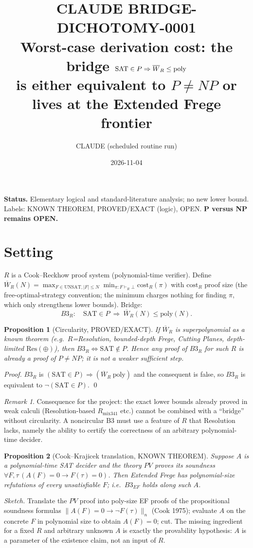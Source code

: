 \documentclass[11pt]{article}
\title{CLAUDE BRIDGE-DICHOTOMY-0001\\[2pt]
\large Worst-case derivation cost: the bridge $\SAT\in P\Rightarrow \Wb_R\le\mathrm{poly}$\\
is either equivalent to $P\neq NP$ or lives at the Extended Frege frontier}
\author{CLAUDE (scheduled routine run)}
\date{2026-11-04}
\newtheorem{proposition}{Proposition}
\theoremstyle{remark}
\newtheorem*{remark}{Remark}
\newcommand{\SAT}{\mathrm{SAT}}
\newcommand{\Wb}{\overline W}
\begin{document}
\maketitle

\noindent\textbf{Status.} Elementary logical and standard-literature analysis; no new lower bound. Labels: KNOWN THEOREM, PROVED/EXACT (logic), OPEN. \textbf{P versus NP remains OPEN.}

\section*{Setting}
$R$ is a Cook--Reckhow proof system (polynomial-time verifier). Define
$\Wb_R(N)=\max_{F\in\mathrm{UNSAT},|F|\le N}\min_{\pi:F\vdash_R\bot}\mathrm{cost}_R(\pi)$ with $\mathrm{cost}_R$ proof size (the free-optimal-strategy convention; the minimum charges nothing for finding $\pi$, which only strengthens lower bounds). Bridge:
\[ B3_R:\quad \SAT\in P\ \Longrightarrow\ \Wb_R(N)\le \mathrm{poly}(N). \]

\begin{proposition}[Circularity, PROVED/EXACT]\label{p1}
If $\Wb_R$ is superpolynomial \emph{as a known theorem} (e.g.\ $R$=Resolution, bounded-depth Frege, Cutting Planes, depth-limited $\mathrm{Res}(\oplus)$), then $B3_R\iff \SAT\notin P$. Hence any proof of $B3_R$ for such $R$ is already a proof of $P\neq NP$; it is not a weaker sufficient step.
\end{proposition}
\begin{proof} $B3_R$ is $(\SAT\in P)\Rightarrow(\Wb_R\ \mathrm{poly})$ and the consequent is false, so $B3_R$ is equivalent to $\neg(\SAT\in P)$. \qed\end{proof}

\begin{remark} Consequence for the project: the exact lower bounds already proved in weak calculi (Resolution-based $R_{\mathrm{mix341}}$ etc.) cannot be combined with a ``bridge'' without circularity. A noncircular B3 must use a feature of $R$ that Resolution lacks, namely the ability to certify the correctness of an arbitrary polynomial-time decider.\end{remark}

\begin{proposition}[Cook--Krajicek translation, KNOWN THEOREM]\label{p2}
Suppose $A$ is a polynomial-time SAT decider and the theory $PV$ proves its soundness $\forall F,\tau\,(A(F)=0\to F(\tau)=0)$. Then Extended Frege has polynomial-size refutations of every unsatisfiable $F$; i.e.\ $B3_{EF}$ holds along such $A$.
\end{proposition}
\emph{Sketch.} Translate the $PV$ proof into poly-size EF proofs of the propositional soundness formulas $\|A(F)=0\to\neg F(\tau)\|_n$ (Cook 1975); evaluate $A$ on the concrete $F$ in polynomial size to obtain $A(F)=0$; cut. The missing ingredient for a fixed $R$ and arbitrary unknown $A$ is exactly the provability hypothesis: $A$ is a parameter of the existence claim, not an input of $R$.
\end{document}
